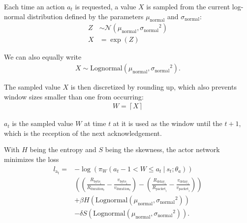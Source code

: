 \documentclass[sigconf]{acmart}
\newcommand\givenbase[1][]{\:#1\lvert\:}
\let\given\givenbase
\begin{document}
Each time an action $a_t$ is requested, a value $X$ is sampled from the current log-normal distribution defined by the parameters $\mu_\text{normal}$ and $\sigma_\text{normal}$: 
\begin{align*}
Z&\sim {\mathcal {N}}(\mu_\text{normal} ,{\sigma_{\text{normal}}}^{2})\\
X&=\exp(Z)
\end{align*}

We can also equally write
\begin{align*}
X \sim \text{Lognormal}\left( \mu_\text{normal}, {\sigma_{\text{normal}}}^{2}\right).
\end{align*}

The sampled value $X$ is then discretized by rounding up, which also prevents window sizes smaller than one from occurring:
\begin{align*}
W = \left\lceil X \right\rceil
\end{align*}

$a_t$ is the sampled value $W$ at time $t$ at it is used as the window until the $t+1$, which is the reception of the next acknowledgement. 


With $H$ being the entropy and $S$ being the skewness, the actor network minimizes the loss
\begin{align*}
l_{\text{a}_t} =& -\log \left( \pi_W\left( a_t-1 < W \leq a_t \given s_t; \theta_a \right)\right)\\
&\left( \left(\frac{R_{\text{byte}_t}}{{R_{\text{duration}_t}}} - \frac{v_{\text{byte}_t}}{{v_{\text{duration}_t}}}\right) - \left( \frac{R_{\text{delay}_t}}{{R_{\text{packet}_t}}}- \frac{v_{\text{delay}_t}}{{v_{\text{packet}_t}}} \right)\right)\\ 
&+ \beta H\left(\text{Lognormal}\left( \mu_\text{normal}, {\sigma_{\text{normal}}}^{2}\right) \right)\\
&- \delta S\left(\text{Lognormal}\left( \mu_\text{normal}, {\sigma_{\text{normal}}}^{2}\right) \right).
\end{align*}
\end{document}
